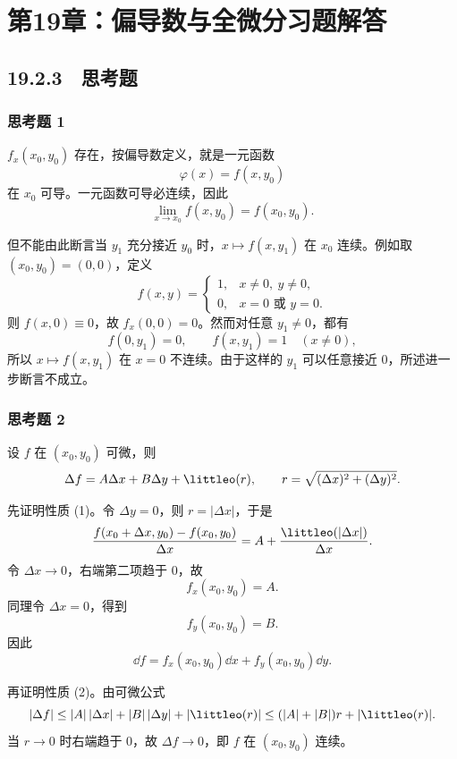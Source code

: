 
\chapter*{第19章：偏导数与全微分习题解答}
\section*{19.2.3　思考题}

\subsection*{思考题 1}
\begin{xsolution}
$f_x(x_0,y_0)$ 存在，按偏导数定义，就是一元函数
\[
  \varphi(x)=f(x,y_0)
\]
在 $x_0$ 可导。一元函数可导必连续，因此
\[
  \lim_{x\to x_0}f(x,y_0)=f(x_0,y_0).
\]

但不能由此断言当 $y_1$ 充分接近 $y_0$ 时，$x\mapsto f(x,y_1)$ 在 $x_0$ 连续。例如取 $(x_0,y_0)=(0,0)$，定义
\[
  f(x,y)=
  \begin{cases}
    1,&x\ne0,\ y\ne0,\\
    0,&x=0\text{ 或 }y=0.
  \end{cases}
\]
则 $f(x,0)\equiv0$，故 $f_x(0,0)=0$。然而对任意 $y_1\ne0$，都有
\[
  f(0,y_1)=0,\qquad f(x,y_1)=1\quad(x\ne0),
\]
所以 $x\mapsto f(x,y_1)$ 在 $x=0$ 不连续。由于这样的 $y_1$ 可以任意接近 $0$，所述进一步断言不成立。
\end{xsolution}

\subsection*{思考题 2}
\begin{xsolution}
设 $f$ 在 $(x_0,y_0)$ 可微，则
\[
  \Delta f=A\Delta x+B\Delta y+\littleo(r),
  \qquad r=\sqrt{(\Delta x)^2+(\Delta y)^2}.
\]

先证明性质 (1)。令 $\Delta y=0$，则 $r=|\Delta x|$，于是
\[
  \frac{f(x_0+\Delta x,y_0)-f(x_0,y_0)}{\Delta x}
  =A+\frac{\littleo(|\Delta x|)}{\Delta x}.
\]
令 $\Delta x\to0$，右端第二项趋于 $0$，故
\[
  f_x(x_0,y_0)=A.
\]
同理令 $\Delta x=0$，得到
\[
  f_y(x_0,y_0)=B.
\]
因此
\[
  \dd f=f_x(x_0,y_0)\dd x+f_y(x_0,y_0)\dd y.
\]

再证明性质 (2)。由可微公式
\[
  |\Delta f|
  \le |A|\,|\Delta x|+|B|\,|\Delta y|+|\littleo(r)|
  \le (|A|+|B|)r+|\littleo(r)|.
\]
当 $r\to0$ 时右端趋于 $0$，故 $\Delta f\to0$，即 $f$ 在 $(x_0,y_0)$ 连续。
\end{xsolution}

